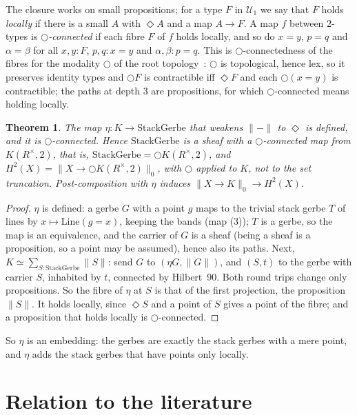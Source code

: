 \documentclass[11pt]{amsart}
\newtheorem{theorem}{Theorem}[section]
\theoremstyle{definition}
\theoremstyle{remark}
\newcommand{\close}{\Diamond}
\newcommand{\tr}[1]{\|#1\|}
\newcommand{\trz}[1]{\|#1\|_0}
\newcommand{\Rx}{R^\times}
\newcommand{\U}{\mathcal U}
\begin{document}
The closure works on small propositions; for a type $F$ in $\U_1$ we say
that $F$ holds \emph{locally} if there is a small $A$ with $\close A$ and a
map $A\to F$. A map $f$ between $2$-types is \emph{$\bigcirc$-connected} if
each fibre $F$ of $f$ holds locally, and so do $x=y$, $p=q$ and
$\alpha=\beta$ for all $x,y:F$, $p,q:x=y$ and $\alpha,\beta:p=q$. This is
$\bigcirc$-connectedness of the fibres for the modality $\bigcirc$ of the
root topology~\cite{RSS}: $\bigcirc$ is topological, hence lex, so it
preserves identity types and $\bigcirc F$ is contractible iff $\close F$ and
each $\bigcirc(x=y)$ is contractible; the paths at depth $3$ are
propositions, for which $\bigcirc$-connected means holding locally.

\begin{theorem}\label{t:k2}
The map $\eta:K\to\mathrm{StackGerbe}$ that weakens $\tr-$ to $\close$ is
defined, and it is $\bigcirc$-connected. Hence $\mathrm{StackGerbe}$ is a
sheaf with a $\bigcirc$-connected map from $K(\Rx,2)$, that is,
$\mathrm{StackGerbe}=\bigcirc K(\Rx,2)$, and
$H^2(X)=\trz{X\to\bigcirc K(\Rx,2)}$, with $\bigcirc$ applied to $K$, not to
the set truncation. Post-composition with $\eta$ induces
$\trz{X\to K}\to H^2(X)$.
\end{theorem}
\begin{proof}
$\eta$ is defined: a gerbe $G$ with a point $g$ maps to the trivial stack
gerbe $T$ of lines by $x\mapsto\mathrm{Line}(g=x)$, keeping the bands (map
(3)); $T$ is a gerbe, so the map is an equivalence, and the carrier of $G$
is a sheaf (being a sheaf is a proposition, so a point may be assumed),
hence also its paths. Next,
$K\simeq\sum_{S:\mathrm{StackGerbe}}\tr{S}$: send $G$ to $(\eta G,\tr G)$,
and $(S,t)$ to the gerbe with carrier $S$, inhabited by $t$, connected by
Hilbert~90. Both round trips change only propositions. So the fibre of
$\eta$ at $S$ is that of the first projection, the proposition $\tr S$. It
holds locally, since $\close S$ and a point of $S$ gives a point of the
fibre; and a proposition that holds locally is $\bigcirc$-connected.
\end{proof}

So $\eta$ is an embedding: the gerbes are exactly the stack gerbes with a
mere point, and $\eta$ adds the stack gerbes that have points only locally.

\section{Relation to the literature}\label{s:lit}
\end{document}
